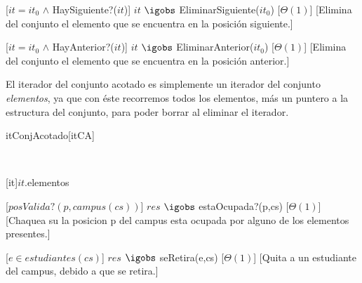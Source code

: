   [$it = it_0$ $\land$ HaySiguiente?($it$)]
  {$it$ $\igobs$ EliminarSiguiente($it_0$)}
  [$\Theta(1)$]
  [Elimina del conjunto el elemento que se encuentra en la posición siguiente.]

  [$it = it_0$ $\land$ HayAnterior?($it$)]
  {$it$ $\igobs$ EliminarAnterior($it_0$)}
  [$\Theta(1)$]
  [Elimina del conjunto el elemento que se encuentra en la posición anterior.]
  

  El iterador del conjunto acotado es simplemente un iterador del conjunto \textit{elementos}, ya que con éste recorremos todos los elementos, más un puntero a la estructura del conjunto, para poder borrar al eliminar el iterador.  

  \begin{Estructura}{itConjAcotado}[itCA]
    \begin{Tupla}[itCA]%
    \end{Tupla}
  \end{Estructura}


  ~

  [it]{$it$.elementos}




  [$posValida?(p,campus(cs))$]
  {$res$ $\igobs$ estaOcupada?(p,cs)}
  [$\Theta(1)$]
  [Chaquea su la posicion p del campus esta ocupada por alguno de los elementos presentes.]  

  [$e \in estudiantes(cs)$]
  {$res$ $\igobs$ seRetira(e,cs)}
  [$\Theta(1)$]
  [Quita a un estudiante del campus, debido a que se retira.]  

